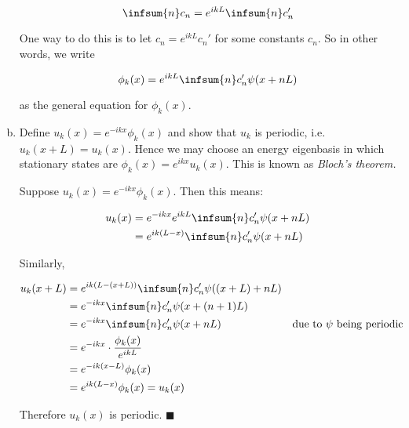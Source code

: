 \documentclass{article}
\begin{document}
\begin{enumerate}[(a)]
\begin{solution}
            \[ \infsum{n} c_n = e^{ikL} \infsum{n} c_n'\] 

            One way to do this is to let $c_n = e^{ikL} c_n'$ for some constants $c_n$. So in other words, we write 

            \[ \phi_k(x) = e^{ikL} \infsum{n} c_n' \psi(x + nL)\] 

            as the general equation for $\phi_k(x)$.
        \end{solution}
        \item Define $u_k(x) = e^{-ikx}\phi_k(x)$ and show that $u_k$ is periodic, i.e. $u_k(x + L) = u_k(x)$. Hence we may choose an energy eigenbasis in which stationary states are $\phi_k(x) = e^{ikx}u_k(x)$. This is known as \textit{Bloch's theorem.}
        
        \begin{solution}
            Suppose $u_k(x) = e^{-ikx} \phi_k(x)$. Then this means:

            \begin{align*}
                u_k(x) &= e^{-ikx}e^{ikL} \infsum{n} c_n' \psi(x + nL)\\
                &= e^{ik(L - x)} \infsum{n} c_n'\psi(x + nL)
            \end{align*}

            Similarly, 

            \begin{align*}
                u_k(x + L) &= e^{ik(L - (x + L))}\infsum{n} c_n' \psi((x + L) + nL)\\
                &= e^{-ikx} \infsum{n} c_n' \psi(x + (n + 1)L)\\
                &= e^{-ikx} \infsum{n} c_n' \psi(x + nL) && \text{due to $\psi$ being periodic}\\
                &= e^{-ikx} \cdot \frac{\phi_k(x)}{e^{ikL}}\\
                &= e^{-ik(x - L)} \phi_k(x)\\
                &= e^{ik(L - x)} \phi_k(x) = u_k(x)
            \end{align*}

            Therefore $u_k(x)$ is periodic. $\blacksquare$


        \end{solution}
    \end{enumerate}
\end{document}
